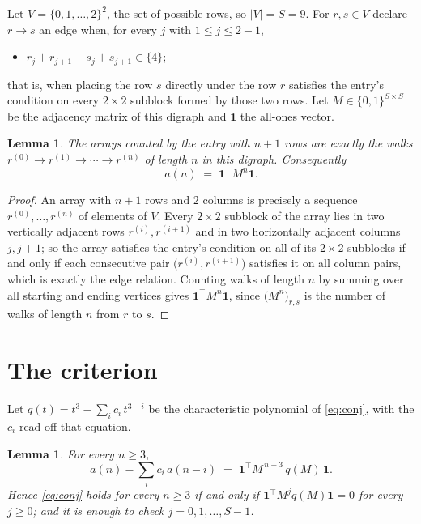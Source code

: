 \documentclass[11pt,a4paper]{article}
\theoremstyle{plain}
\newtheorem{lemma}[theorem]{Lemma}
\theoremstyle{definition}
\begin{document}
Let $V=\{0,1,\dots,2\}^{2}$, the set of possible rows, so $|V|=S=9$. For
$r,s\in V$ declare $r\to s$ an edge when, for every $j$ with $1\le j\le 2-1$,
\begin{itemize}
\item $r_j+r_{j+1}+s_j+s_{j+1}\in\{4\}$;

\end{itemize}
that is, when placing the row $s$ directly under the row $r$ satisfies the entry's
condition on every $2\times2$ subblock formed by those two rows. Let $M\in\{0,1\}^{S\times
S}$ be the adjacency matrix of this digraph and $\mathbf{1}$ the all-ones vector.

\begin{lemma}\label{lem:walk}
The arrays counted by the entry with $n+1$ rows are exactly the walks
$r^{(0)}\to r^{(1)}\to\cdots\to r^{(n)}$ of length $n$ in this digraph. Consequently
\[
a(n)\;=\;\mathbf{1}^{\!\top}M^{n}\mathbf{1} .
\]
\end{lemma}

\begin{proof}
An array with $n+1$ rows and $2$ columns is precisely a sequence
$r^{(0)},\dots,r^{(n)}$ of elements of $V$. Every $2\times2$ subblock of the array lies
in two vertically adjacent rows $r^{(i)},r^{(i+1)}$ and in two horizontally adjacent
columns $j,j+1$; so the array satisfies the entry's condition on all of its $2\times2$
subblocks if and only if each consecutive pair $\bigl(r^{(i)},r^{(i+1)}\bigr)$ satisfies
it on all column pairs, which is exactly the edge relation. Counting walks of length $n$ by
summing over all starting and ending vertices gives
$\mathbf{1}^{\!\top}M^{n}\mathbf{1}$, since
$\bigl(M^{n}\bigr)_{r,s}$ is the number of walks of length $n$ from $r$ to $s$.
\end{proof}

\section{The criterion}

Let $q(t)=t^{3}-\sum_{i}c_i\,t^{3-i}$ be the characteristic polynomial of
\eqref{eq:conj}, with the $c_i$ read off that equation.

\begin{lemma}\label{lem:crit}
For every $n\ge3$,
\[
a(n)-\sum_i c_i\,a(n-i)\;=\;\mathbf{1}^{\!\top}M^{\,n-3}\,q(M)\,\mathbf{1} .
\]
Hence \eqref{eq:conj} holds for every $n\ge3$ if and only if
$\mathbf{1}^{\!\top}M^{j}q(M)\mathbf{1}=0$ for every $j\ge0$; and it is enough to
check $j=0,1,\dots,S-1$.
\end{lemma}
\end{document}
